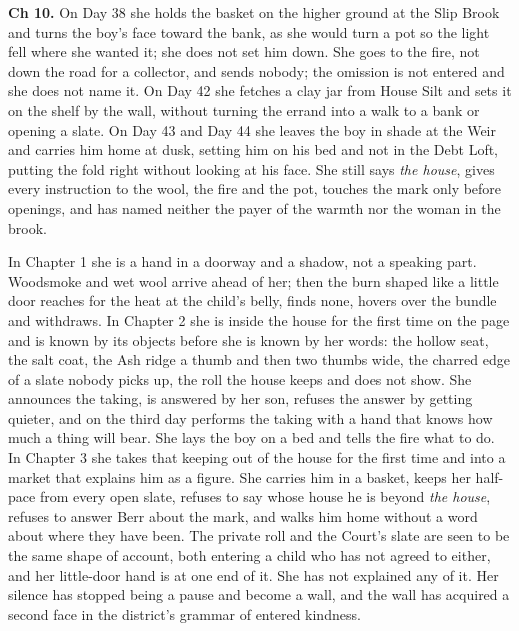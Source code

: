 \documentclass{design/chronicle}
\begin{document}
{\textbf{Ch 10.} On Day 38 she holds the basket on the higher ground at the Slip Brook and turns the boy’s face toward the bank, as she would turn a pot so the light fell where she wanted it; she does not set him down. She goes to the fire, not down the road for a collector, and sends nobody; the omission is not entered and she does not name it. On Day 42 she fetches a clay jar from House Silt and sets it on the shelf by the wall, without turning the errand into a walk to a bank or opening a slate. On Day 43 and Day 44 she leaves the boy in shade at the Weir and carries him home at dusk, setting him on his bed and not in the Debt Loft, putting the fold right without looking at his face. She still says \emph{the house}, gives every instruction to the wool, the fire and the pot, touches the mark only before openings, and has named neither the payer of the warmth nor the woman in the brook.

In Chapter 1 she is a hand in a doorway and a shadow, not a speaking part. Woodsmoke and wet wool arrive ahead of her; then the burn shaped like a little door reaches for the heat at the child’s belly, finds none, hovers over the bundle and withdraws. In Chapter 2 she is inside the house for the first time on the page and is known by its objects before she is known by her words: the hollow seat, the salt coat, the Ash ridge a thumb and then two thumbs wide, the charred edge of a slate nobody picks up, the roll the house keeps and does not show. She announces the taking, is answered by her son, refuses the answer by getting quieter, and on the third day performs the taking with a hand that knows how much a thing will bear. She lays the boy on a bed and tells the fire what to do. In Chapter 3 she takes that keeping out of the house for the first time and into a market that explains him as a figure. She carries him in a basket, keeps her half-pace from every open slate, refuses to say whose house he is beyond \emph{the house}, refuses to answer Berr about the mark, and walks him home without a word about where they have been. The private roll and the Court’s slate are seen to be the same shape of account, both entering a child who has not agreed to either, and her little-door hand is at one end of it. She has not explained any of it. Her silence has stopped being a pause and become a wall, and the wall has acquired a second face in the district’s grammar of entered kindness.

}
\end{document}
